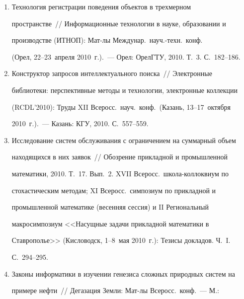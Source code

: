 \begin{enumerate}[1.]
(НИТО-Байкал): Мат-лы междунар.\ науч.-практич.\ конф.\  (Улан-Удэ, 


12--14~июля 2010~г.).~--- Улан-Удэ: БФФК; РГППУ; ОмГУ, 2010. С.~251--253.


\item {}


Технология регистрации поведения объектов в трехмерном 


пространстве~/\!\!/  Информационные технологии в науке, образовании и 


производстве (ИТНОП): Мат-лы Междунар.\ науч.-техн.\ конф.\ 


(Орел, 22--23~апреля 2010~г.).~--- Орел: ОрелГТУ, 2010. Т.~3. С.~182--186.


\item {}


Конструктор запросов интеллектуального поиска~/\!\!/  Электронные 


библиотеки: перспективные методы и технологии, электронные коллекции 


(RCDL'2010): Труды XII Всеросс.\  науч.\ конф.\ (Казань, 13--17~октября 


2010~г.).~--- Казань: КГУ, 2010. С.~557--559.


\item {}


Исследование сис\-тем обслуживания с ограничением на суммарный объем 


находящихся в них заявок~/\!\!/  Обозрение прикладной и промышленной 


математики, 2010. Т.~17. Вып.~2. XVII Всеросс.\ школа-коллоквиум по 


стохастическим методам; XI Всеросс.\ симпозиум по прикладной и 


промышленной математике (весенняя сессия) и II Региональный 


макросимпозиум <<Насущные задачи прикладной математики в 


Ставрополье>> (Кисловодск, 1--8~мая 2010~г.): Тезисы докладов. Ч.~I. 


С.~294--295.


\item {}


Законы информатики в изучении генезиса сложных природных сис\-тем на 


примере нефти~/\!\!/  Дегазация Земли: Мат-лы Всеросс.\  конф.~--- М.: 



\end{enumerate}
